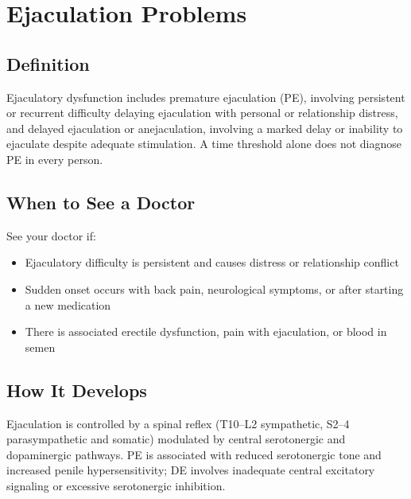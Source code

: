 \chapter{Ejaculation Problems}

\section*{Definition}
 Ejaculatory dysfunction includes premature ejaculation (PE), involving persistent or recurrent difficulty delaying ejaculation with personal or relationship distress, and delayed ejaculation or anejaculation, involving a marked delay or inability to ejaculate despite adequate stimulation. A time threshold alone does not diagnose PE in every person.

\section*{When to See a Doctor}
See your doctor if:
\begin{itemize}
  \item Ejaculatory difficulty is persistent and causes distress or relationship conflict
  \item Sudden onset occurs with back pain, neurological symptoms, or after starting a new medication
  \item There is associated erectile dysfunction, pain with ejaculation, or blood in semen
\end{itemize}

\section*{How It Develops}
Ejaculation is controlled by a spinal reflex (T10--L2 sympathetic, S2--4 parasympathetic and somatic) modulated by central serotonergic and dopaminergic pathways. PE is associated with reduced serotonergic tone and increased penile hypersensitivity; DE involves inadequate central excitatory signaling or excessive serotonergic inhibition.

